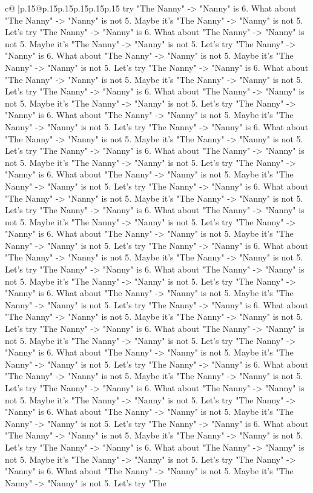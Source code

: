 \documentclass{article}
\begin{document}
{\begin{supertabular}{c@{$\;$}|p{.15\linewidth}@{}p{.15\linewidth}p{.15\linewidth}p{.15\linewidth}p{.15\linewidth}p{.15\linewidth}}
{{{try "The Nanny" {-}> "Nanny" is 6. What about "The Nanny" {-}> "Nanny" is not 5. Maybe it's "The Nanny" {-}> "Nanny" is not 5. Let's try "The Nanny" {-}> "Nanny" is 6. What about "The Nanny" {-}> "Nanny" is not 5. Maybe it's "The Nanny" {-}> "Nanny" is not 5. Let's try "The Nanny" {-}> "Nanny" is 6. What about "The Nanny" {-}> "Nanny" is not 5. Maybe it's "The Nanny" {-}> "Nanny" is not 5. Let's try "The Nanny" {-}> "Nanny" is 6. What about "The Nanny" {-}> "Nanny" is not 5. Maybe it's "The Nanny" {-}> "Nanny" is not 5. Let's try "The Nanny" {-}> "Nanny" is 6. What about "The Nanny" {-}> "Nanny" is not 5. Maybe it's "The Nanny" {-}> "Nanny" is not 5. Let's try "The Nanny" {-}> "Nanny" is 6. What about "The Nanny" {-}> "Nanny" is not 5. Maybe it's "The Nanny" {-}> "Nanny" is not 5. Let's try "The Nanny" {-}> "Nanny" is 6. What about "The Nanny" {-}> "Nanny" is not 5. Maybe it's "The Nanny" {-}> "Nanny" is not 5. Let's try "The Nanny" {-}> "Nanny" is 6. What about "The Nanny" {-}> "Nanny" is not 5. Maybe it's "The Nanny" {-}> "Nanny" is not 5. Let's try "The Nanny" {-}> "Nanny" is 6. What about "The Nanny" {-}> "Nanny" is not 5. Maybe it's "The Nanny" {-}> "Nanny" is not 5. Let's try "The Nanny" {-}> "Nanny" is 6. What about "The Nanny" {-}> "Nanny" is not 5. Maybe it's "The Nanny" {-}> "Nanny" is not 5. Let's try "The Nanny" {-}> "Nanny" is 6. What about "The Nanny" {-}> "Nanny" is not 5. Maybe it's "The Nanny" {-}> "Nanny" is not 5. Let's try "The Nanny" {-}> "Nanny" is 6. What about "The Nanny" {-}> "Nanny" is not 5. Maybe it's "The Nanny" {-}> "Nanny" is not 5. Let's try "The Nanny" {-}> "Nanny" is 6. What about "The Nanny" {-}> "Nanny" is not 5. Maybe it's "The Nanny" {-}> "Nanny" is not 5. Let's try "The Nanny" {-}> "Nanny" is 6. What about "The Nanny" {-}> "Nanny" is not 5. Maybe it's "The Nanny" {-}> "Nanny" is not 5. Let's try "The Nanny" {-}> "Nanny" is 6. What about "The Nanny" {-}> "Nanny" is not 5. Maybe it's "The Nanny" {-}> "Nanny" is not 5. Let's try "The Nanny" {-}> "Nanny" is 6. What about "The Nanny" {-}> "Nanny" is not 5. Maybe it's "The Nanny" {-}> "Nanny" is not 5. Let's try "The Nanny" {-}> "Nanny" is 6. What about "The Nanny" {-}> "Nanny" is not 5. Maybe it's "The Nanny" {-}> "Nanny" is not 5. Let's try "The Nanny" {-}> "Nanny" is 6. What about "The Nanny" {-}> "Nanny" is not 5. Maybe it's "The Nanny" {-}> "Nanny" is not 5. Let's try "The Nanny" {-}> "Nanny" is 6. What about "The Nanny" {-}> "Nanny" is not 5. Maybe it's "The Nanny" {-}> "Nanny" is not 5. Let's try "The Nanny" {-}> "Nanny" is 6. What about "The Nanny" {-}> "Nanny" is not 5. Maybe it's "The Nanny" {-}> "Nanny" is not 5. Let's try "The Nanny" {-}> "Nanny" is 6. What about "The Nanny" {-}> "Nanny" is not 5. Maybe it's "The Nanny" {-}> "Nanny" is not 5. Let's try "The Nanny" {-}> "Nanny" is 6. What about "The Nanny" {-}> "Nanny" is not 5. Maybe it's "The Nanny" {-}> "Nanny" is not 5. Let's try "The Nanny" {-}> "Nanny" is 6. What about "The Nanny" {-}> "Nanny" is not 5. Maybe it's "The Nanny" {-}> "Nanny" is not 5. Let's try "The Nanny" {-}> "Nanny" is 6. What about "The Nanny" {-}> "Nanny" is not 5. Maybe it's "The Nanny" {-}> "Nanny" is not 5. Let's try "The }}}
\end{supertabular}}
\end{document}

